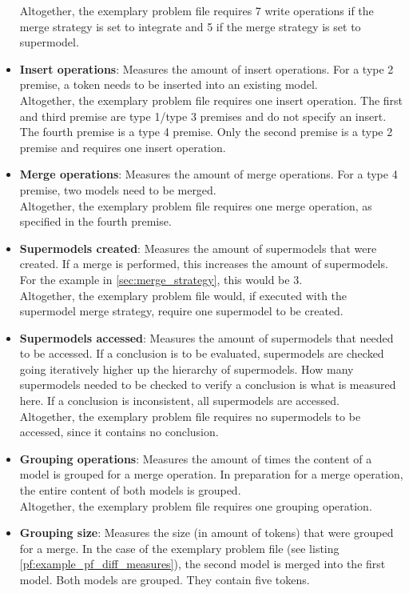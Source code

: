 \documentclass[hidelinks]{scrartcl}
\begin{document}
\begin{itemize}
	Altogether, the exemplary problem file requires 7 write operations if the merge strategy is set to integrate and 5 if the merge strategy is set to supermodel.
	\item \textbf{Insert operations}: Measures the amount of insert operations. For a type 2 premise, a token needs to be inserted into an existing model. \\
	Altogether, the exemplary problem file requires one insert operation. The first and third premise are type 1/type 3 premises and do not specify an insert. The fourth premise is a type 4 premise. Only the second premise is a type 2 premise and requires one insert operation.
	\item \textbf{Merge operations}: Measures the amount of merge operations. For a type 4 premise, two models need to be merged. \\
	Altogether, the exemplary problem file requires one merge operation, as specified in the fourth premise.
	\item \textbf{Supermodels created}: Measures the amount of supermodels that were created. If a merge is performed, this increases the amount of supermodels. For the example in \ref{sec:merge_strategy}, this would be 3. \\
	Altogether, the exemplary problem file would, if executed with the supermodel merge strategy, require one supermodel to be created.
	\item \textbf{Supermodels accessed}: Measures the amount of supermodels that needed to be accessed. If a conclusion is to be evaluated, supermodels are checked going iteratively higher up the hierarchy of supermodels. How many supermodels needed to be checked to verify a conclusion is what is measured here. If a conclusion is inconsistent, all supermodels are accessed. \\
	Altogether, the exemplary problem file requires no supermodels to be accessed, since it contains no conclusion.
	\item \textbf{Grouping operations}: Measures the amount of times the content of a model is grouped for a merge operation. In preparation for a merge operation, the entire content of both models is grouped. \\
	Altogether, the exemplary problem file requires one grouping operation.
	\item \textbf{Grouping size}: Measures the size (in amount of tokens) that were grouped for a merge. In the case of the exemplary problem file (see listing \ref{pf:example_pf_diff_measures}), the second model is merged into the first model. Both models are grouped. They contain five tokens. \\

\end{itemize}
\end{document}
